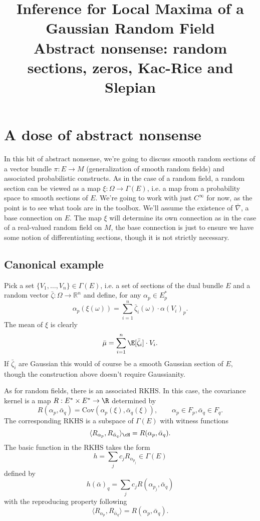 \documentclass{article}
\title{ {\bf Inference for Local Maxima of a Gaussian Random Field} \\ Abstract nonsense: random sections, zeros, Kac-Rice and Slepian}
\newcommand{\randsec}{\xi}
\newcommand{\meansec}{\bar{\mu}}
\begin{document}
	\maketitle
	\RaggedRight

\section{A dose of abstract nonsense}

In this bit of abstract nonsense, we're going to discuss smooth random
sections of a vector bundle $\pi:E \to M$ (generalization of smooth random
fields) and associated probabilistic constructs. As in the case of a random field, a random section can
be viewed as a map $\randsec:\Omega \to \Gamma(E)$, i.e. a map from a probability space to smooth sections of $E$.
We're going to work with just $C^{\infty}$ for now, as the point is to see what tools are in the toolbox.
We'll assume the existence of $\bar{\nabla}$, a base connection on $E$. The map $\randsec$ will determine
its own connection as in the case of a real-valued random field on $M$, the base connection is just to
ensure we have some notion of differentiating sections, though it is not strictly necessary.

\subsection{Canonical example}

Pick a set $\{V_1, \dots, V_n\} \in \Gamma(E)$, i.e. a set of sections of the dual bundle $E$ and
a random vector $\bar{\zeta}:\Omega \rightarrow \mathbb{R}^n$ and define, for any $\alpha_p \in E_p^*$
\begin{equation}
  \label{eq:process}
\alpha_p(\randsec(\omega)) = \sum_{i=1}^n \bar{\zeta}_i(\omega) \cdot \alpha(V_i)_p.
\end{equation}
The mean of $\randsec$ is clearly
\begin{equation}
  \label{eq:meansec}
\meansec = \sum_{i=1}^n \E[\bar{\zeta}_i] \cdot V_i.
\end{equation}
If $\bar{\zeta}_i$ are Gaussian this would of course be a smooth Gaussian section of $E$, though
the construction above doesn't require Gaussianity.

As for random fields, there is an associated RKHS. In this case, the covariance kernel is a map $R:E^* \times E^* \to \R$ determined by
$$
R(\alpha_p, \bar{\alpha}_q) = \text{Cov}(\alpha_p(\randsec), \bar{\alpha}_q(\randsec)), \qquad \alpha_p \in F_p, \bar{\alpha}_q \in F_q.
$$
The corresponding  RKHS is a subspace of $\Gamma(E)$ with witness functions
$$
\langle R_{\alpha_p}, R_{\bar{\alpha}_q} \rangle_{\cH} = R(\alpha_p, \bar{\alpha}_q).
$$
The basic function in the RKHS takes the form
$$
h = \sum_j c_j R_{\alpha_{p_j}}   \in \Gamma(E)
$$
defined by
$$
h(\bar{\alpha})_q = \sum_j c_j R(\alpha_{p_j}, \bar{\alpha}_q)
$$
with the reproducing property following
$$
\langle R_{\alpha_p}, R_{\bar{\alpha}_q} \rangle = R(\alpha_p, \bar{\alpha}_q).
$$
\end{document}
